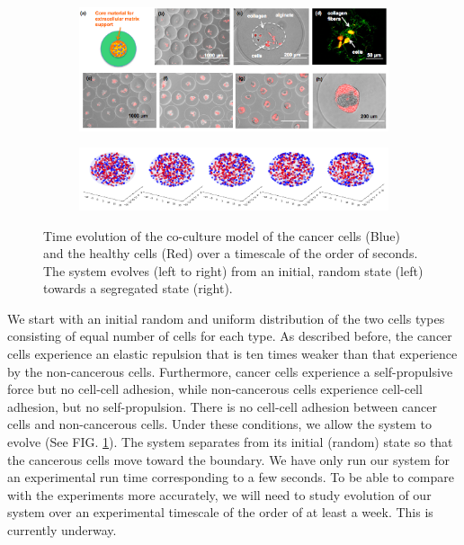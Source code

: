 \documentclass[aps,prb,twocolumn,groupedaddress,nofootinbib,floatfix]{revtex4}
\begin{document}
\begin{figure}
  \centering
  \begin{subfigure}[t]{1.0\textwidth}
    \includegraphics[width=\textwidth]{images/experimental.png}
  \end{subfigure}
  \begin{subfigure}[t]{1.0\textwidth}
    \includegraphics[width=\textwidth]{images/separation.png}
  \end{subfigure}
  \caption[separation]{Time evolution of the co-culture model of the cancer cells (Blue) and the healthy cells (Red) over a timescale of the order of seconds. The system evolves (left to right) from an initial, random state (left) towards a segregated state (right).}
   \label{fig:separation}
\end{figure}

We start with an initial random and uniform distribution of the two cells types consisting of  
equal number of cells for each type. As described before, the cancer cells experience an elastic
repulsion that is ten times weaker than that experience by the non-cancerous cells. Furthermore, 
cancer cells experience a self-propulsive force but no cell-cell adhesion, while non-cancerous cells
experience cell-cell adhesion, but no self-propulsion. There is no cell-cell adhesion between cancer cells
and non-cancerous cells.  Under these conditions, we allow the system to evolve (See
FIG. \ref{fig:separation}). The system separates from its initial (random) state
so that the cancerous cells move toward the boundary. We have only run our system for an experimental run time
corresponding to a few seconds. To be able to compare with the experiments more accurately, we will need to study evolution
of our system over an experimental timescale of the order of at least a week. This is currently underway. 
\end{document}
